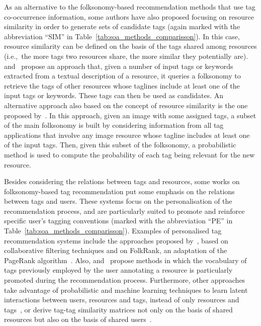 As an alternative to the folksonomy-based recommendation methods that use tag co-occurrence information, some authors have also proposed focusing on resource similarity in order to generate sets of candidate tags (again marked with the abbreviation ``SIM'' in Table~\ref{tab:soa_methods_comparisson}). 
In this case, resource similarity can be defined on the basis of the tags shared among resources (i.e.,~the more tags two resources share, the more similar they potentially are). \cite{Sevil2010a} and~\cite{Lops2012} propose an approach that, given a number of input tags or keywords extracted from a textual description of a resource, it queries a folksonomy to retrieve the tags of other resources whose taglines include at least one of the input tags or keywords. These tags can then be used as candidates. An alternative approach also based on the concept of resource similarity is the one proposed by~\cite{Lee2010}. In this approach, given an image with some assigned tags, a subset of the main folksonomy is built by considering information from all tag applications that involve any image resource whose tagline includes at least one of the input tags. Then, given this subset of the folksonomy, a probabilistic method is used to compute the probability of each tag being relevant for the new resource.

Besides considering the relations between tags and resources, some works on folksonomy-based tag recommendation put some emphasis on the relations between tags and users. These systems focus on the personalisation of the recommendation process, and are particularly suited to promote and reinforce specific user's tagging conventions (marked with the abbreviation ``PE'' in Table~\ref{tab:soa_methods_comparisson}). 
Examples of personalised tag recommendation systems include the approaches proposed by~\cite{jaske2007}, based on collaborative filtering techniques and on FolkRank, an adaptation of the PageRank algorithm~\citep{Brin2012}. Also, \cite{Garg2008} and~\cite{Lipczak2008} propose methods in which the vocabulary of tags previously employed by the user annotating a resource is particularly promoted during the recommendation process. Furthermore, other approaches take advantage of probabilistic and machine learning techniques to learn latent interactions between users, resources and tags, instead of only resources and tags~\citep{Rendle2009, Marinho2009}, or derive tag-tag similarity matrices not only on the basis of shared resources but also on the basis of shared users~\citep{Cao2009}. 

